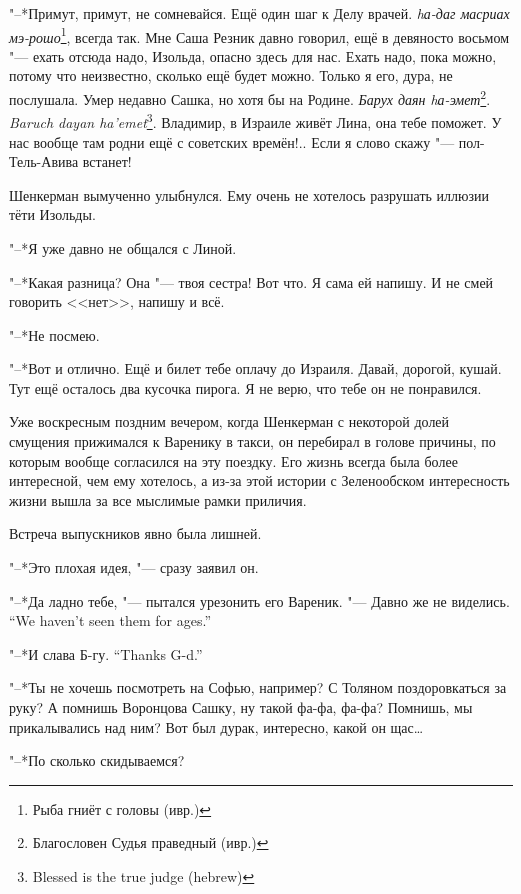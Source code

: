 "--*Примут, примут, не сомневайся.
Ещё один шаг к Делу врачей.
\textit{hа-даг масриах мэ-рошо}\footnote{Рыба гниёт с головы (ивр.)}, всегда так.
Мне Саша Резник давно говорил, ещё в девяносто восьмом "--- ехать отсюда надо, Изольда, опасно здесь для нас.
Ехать надо, пока можно, потому что неизвестно, сколько ещё будет можно.
Только я его, дура, не послушала.
Умер недавно Сашка, но хотя бы на Родине.
{\textit{Барух даян hа-эмет}\footnote{Благословен Судья праведный (ивр.)}.}
{\textit{Baruch dayan ha'emet}\footnote{Blessed is the true judge (hebrew)}.}
Владимир, в Израиле живёт Лина, она тебе поможет.
У нас вообще там родни ещё с советских времён!..
Если я слово скажу "--- пол-Тель-Авива встанет!

Шенкерман вымученно улыбнулся.
Ему очень не хотелось разрушать иллюзии тёти Изольды.

"--*Я уже давно не общался с Линой.

"--*Какая разница?
Она "--- твоя сестра!
Вот что.
Я сама ей напишу.
И не смей говорить <<нет>>, напишу и всё.

"--*Не посмею.

"--*Вот и отлично.
Ещё и билет тебе оплачу до Израиля.
Давай, дорогой, кушай.
Тут ещё осталось два кусочка пирога.
Я не верю, что тебе он не понравился.

\textspace

\asterism

\label{Sun_2012_07_22}

Уже воскресным поздним вечером, когда Шенкерман с некоторой долей смущения прижимался к Варенику в такси, он перебирал в голове причины, по которым вообще согласился на эту поездку.
Его жизнь всегда была более интересной, чем ему хотелось, а из-за этой истории с Зеленообском интересность жизни вышла за все мыслимые рамки приличия.

Встреча выпускников явно была лишней.

"--*Это плохая идея, "--- сразу заявил он.

"--*Да ладно тебе, "--- пытался урезонить его Вареник.
{"--- Давно же не виделись.}
{``We haven't seen them for ages.''}

{"--*И слава Б-гу.}
{``Thanks G-d.''}

"--*Ты не хочешь посмотреть на Софью, например?
С Толяном поздоровкаться за руку?
А помнишь Воронцова Сашку, ну такой фа-фа, фа-фа?
Помнишь, мы прикалывались над ним?
Вот был дурак, интересно, какой он щас\dots{}

"--*По сколько скидываемся?

